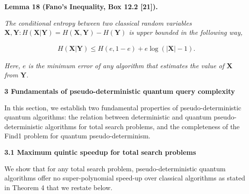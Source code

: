 



\par\medskip\noindent\textbf{
\textbf{Lemma 18}\textbf{ }(Fano’s Inequality, Box 12.2 [21])\textbf{.}
}\par



\emph{The conditional entropy between two classical random variables $\mathbf{X},\mathbf{Y}:H(\mathbf{X}|\mathbf{Y})=H(\mathbf{X},\mathbf{Y})-H(\mathbf{Y})$ is upper bounded in the following way,}\par


\[\begin{gathered}
H(\mathbf{X}|\mathbf{Y})\leq H(e,1-e)+e\log(|\mathbf{X}|-1).
\end{gathered}\]


\emph{Here, $e$ is the minimum error of any algorithm that estimates the value of $\mathbf{X}$ from $\mathbf{Y}$.}\par








\par\medskip\noindent\textbf{
3 Fundamentals of pseudo-deterministic quantum query complexity}\par




In this section, we establish two fundamental properties of pseudo-deterministic quantum algorithms: the relation between deterministic and quantum pseudo-deterministic algorithms for total search problems, and the completeness of the Find1 problem for quantum pseudo-determinism.\par




\par\medskip\noindent\textbf{
3.1 Maximum quintic speedup for total search problems}\par




We show that for any total search problem, pseudo-deterministic quantum algorithms offer no super-polynomial speed-up over classical algorithms as stated in Theorem 4 that we restate below.\par







